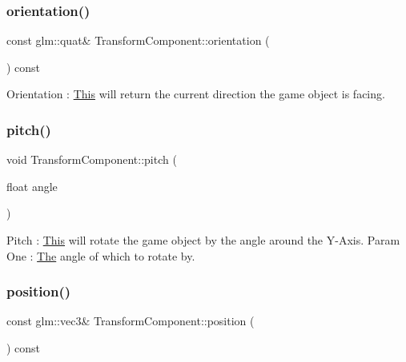 \mbox{\label{class_transform_component_a7655d65aee0cb5dc459e8f632c80a6d1}} 
\subsubsection{\texorpdfstring{orientation()}{orientation()}}
{\footnotesize\ttfamily const glm\+::quat\& Transform\+Component\+::orientation (\begin{DoxyParamCaption}{ }\end{DoxyParamCaption}) const\hspace{0.3cm}{\ttfamily [inline]}}

Orientation \+: \mbox{\hyperlink{class_this}{This}} will return the current direction the game object is facing. \mbox{\label{class_transform_component_ad363ec339461bde470fcc50103d12ba7}} 
\subsubsection{\texorpdfstring{pitch()}{pitch()}}
{\footnotesize\ttfamily void Transform\+Component\+::pitch (\begin{DoxyParamCaption}\item[{float}]{angle }\end{DoxyParamCaption})\hspace{0.3cm}{\ttfamily [inline]}}

Pitch \+: \mbox{\hyperlink{class_this}{This}} will rotate the game object by the angle around the Y-\/\+Axis. Param One \+: \mbox{\hyperlink{class_the}{The}} angle of which to rotate by. \mbox{\label{class_transform_component_a1f236ca0fb57ccb2a5e1238502a880ac}} 
\subsubsection{\texorpdfstring{position()}{position()}}
{\footnotesize\ttfamily const glm\+::vec3\& Transform\+Component\+::position (\begin{DoxyParamCaption}{ }\end{DoxyParamCaption}) const\hspace{0.3cm}{\ttfamily [inline]}}

